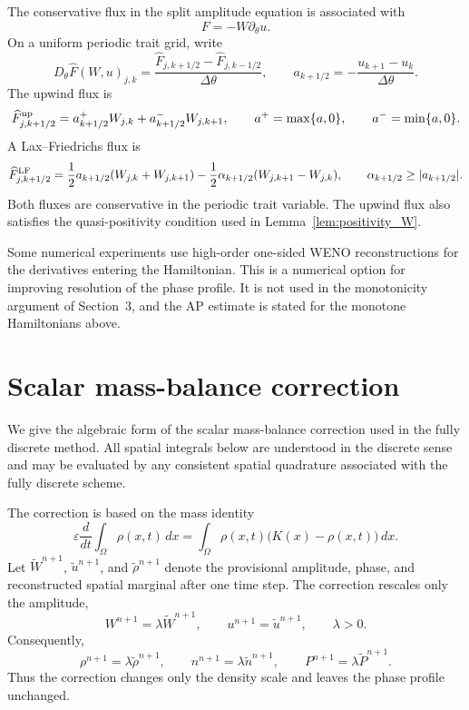 \documentclass[11pt]{article}
\begin{document}
The conservative flux in the split amplitude equation is associated with
\[
    F=-W\partial_\theta u.
\]
On a uniform periodic trait grid, write
\[
    D_\theta\widehat F(W,u)_{j,k}
    =
    \frac{\widehat F_{j,k+1/2}-\widehat F_{j,k-1/2}}{\Delta\theta},
    \qquad
    a_{k+1/2}
    =
    -\frac{u_{k+1}-u_k}{\Delta\theta}.
\]
The upwind flux is
\begin{equation}
\label{eq:app_upwind_flux}
    \widehat F^{\rm up}_{j,k+1/2}
    =
    a_{k+1/2}^+ W_{j,k}
    +
    a_{k+1/2}^- W_{j,k+1},
    \qquad
    a^+=\max\{a,0\},
    \qquad
    a^-=\min\{a,0\}.
\end{equation}
A Lax--Friedrichs flux is
\begin{equation}
\label{eq:app_LF_flux}
    \widehat F^{\rm LF}_{j,k+1/2}
    =
    \frac12 a_{k+1/2}(W_{j,k}+W_{j,k+1})
    -
    \frac12\alpha_{k+1/2}(W_{j,k+1}-W_{j,k}),
    \qquad
    \alpha_{k+1/2}\ge |a_{k+1/2}|.
\end{equation}
Both fluxes are conservative in the periodic trait variable.  The upwind flux
also satisfies the quasi-positivity condition used in
Lemma~\ref{lem:positivity_W}.

Some numerical experiments use high-order one-sided WENO reconstructions for
the derivatives entering the Hamiltonian.  This is a numerical option for
improving resolution of the phase profile.  It is not used in the monotonicity
argument of Section~3, and the AP estimate is stated for the monotone
Hamiltonians above.


\section{Scalar mass-balance correction}
\label{app:mass_correction}

We give the algebraic form of the scalar mass-balance correction used in the
fully discrete method.  All spatial integrals below are understood in the
discrete sense and may be evaluated by any consistent spatial quadrature
associated with the fully discrete scheme.

The correction is based on the mass identity
\[
    \varepsilon \frac{d}{dt}\int_\Omega \rho(x,t)\,dx
    =
    \int_\Omega \rho(x,t)\bigl(K(x)-\rho(x,t)\bigr)\,dx .
\]
Let \(\widetilde W^{n+1}\), \(\widetilde u^{n+1}\), and
\(\widetilde\rho^{n+1}\) denote the provisional amplitude, phase, and
reconstructed spatial marginal after one time step.  The correction rescales
only the amplitude,
\[
    W^{n+1}=\lambda\widetilde W^{n+1},
    \qquad
    u^{n+1}=\widetilde u^{n+1},
    \qquad
    \lambda>0 .
\]
Consequently,
\[
    \rho^{n+1}=\lambda\widetilde\rho^{n+1},
    \qquad
    n^{n+1}=\lambda\widetilde n^{n+1},
    \qquad
    P^{n+1}=\lambda\widetilde P^{n+1}.
\]
Thus the correction changes only the density scale and leaves the phase profile
unchanged.
\end{document}
